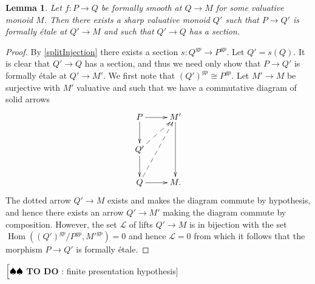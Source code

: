 \documentclass[12pt]{amsart}
\numberwithin{equation}{section}
\theoremstyle{plain}
\newtheorem{lem}[equation]{Lemma}
\theoremstyle{remark}
\newcommand{\todo}[1]{$\Bigl[ \spadesuit\spadesuit$ \textsf{{\bf TO DO} : #1}$\Bigr]$}
\DeclareMathOperator{\Hom}{Hom}
\newcommand{\calL}{\mathcal{L}}
\begin{document}
\begin{lem}
	Let $f:P\to Q$ be formally smooth at $Q\to M$ for some valuative monoid $M$. Then there exists a sharp valuative monoid $Q'$ such that $P\to Q'$ is formally \'etale at $Q'\to M$ and such that $Q'\to Q$ has a section. 
\end{lem}
\begin{proof}
	By \eqref{splitInjection} there exists a section $s:Q^{gp}\to P^{gp}$. Let $Q' = s(Q)$. It is clear that $Q'\to Q$ has a section, and thus we need only show that $P\to Q'$ is formally \'etale at $Q'\to M'$. We first note that $(Q')^{gp}\cong P^{gp}$. Let $M'\to M$ be surjective with $M'$ valuative and such that we have a commutative diagram of solid arrows
$$ \xymatrix{
	P\ar[r]\ar[d] & M'\ar[dd]\\
	Q' \ar@{-->}[ur]\ar[d] & \\
	Q \ar[r]\ar@{-->}[uur] & M.
	}$$
The dotted arrow $Q'\to M$ exists and makes the diagram commute by hypothesis, and hence there exists an arrow $Q'\to M'$ making the diagram commute by composition. However, the set $\calL$ of lifts $Q'\to M$ is in bijection with the set $\Hom((Q')^{gp}/P^{gp}, M'^{gp}) = 0$ and hence $\calL = 0$ from which it follows that the morphism $P\to Q'$ is formally \'etale. 

\end{proof}

\todo{finite presentation hypothesis}

\end{document}
